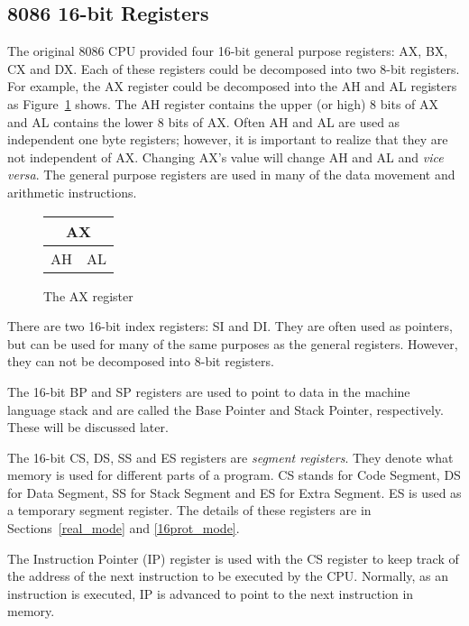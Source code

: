 \subsection{8086 16-bit Registers}

The original 8086 CPU provided four 16-bit general purpose registers:
AX, BX, CX and DX. Each of these registers could be decomposed into
two 8-bit registers. For example, the AX register could be decomposed
into the AH and AL registers as Figure~\ref{fig:AX_reg} shows. The AH
register contains the upper (or high) 8 bits of AX and AL contains the
lower 8 bits of AX. Often AH and AL are used as independent one byte
registers; however, it is important to realize that they are not
independent of AX. Changing AX's value will change AH and AL and
{\em vice versa}\/. The general purpose registers are used in many of
the data movement and arithmetic instructions.

\begin{figure}
\begin{center}
\begin{tabular}{cc}
\multicolumn{2}{c}{AX} \\
\hline
\multicolumn{1}{||c|}{AH} & \multicolumn{1}{c||}{AL} \\
\hline
\end{tabular}
\caption{The AX register \label{fig:AX_reg} }
\end{center}
\end{figure}

There are two 16-bit index registers: SI and
DI. They are often used as pointers, but can be used for many of the
same purposes as the general registers. However, they can not be
decomposed into 8-bit registers.

The 16-bit BP and SP registers are used to point to data in the
machine language stack and are called the Base Pointer 
and Stack Pointer, respectively. These will be discussed later. 

The 16-bit CS, DS, SS and ES registers are \emph{segment
registers}.  They denote what memory is used
for different parts of a program. CS stands for Code Segment, DS for
Data Segment, SS for Stack Segment and ES for Extra Segment. ES is
used as a temporary segment register. The details of these registers
are in Sections~\ref{real_mode} and \ref{16prot_mode}.

The Instruction Pointer (IP)  register is used with
the CS register to keep track of the address of the next instruction
to be executed by the CPU. Normally, as an instruction is executed, IP
is advanced to point to the next instruction in memory.

